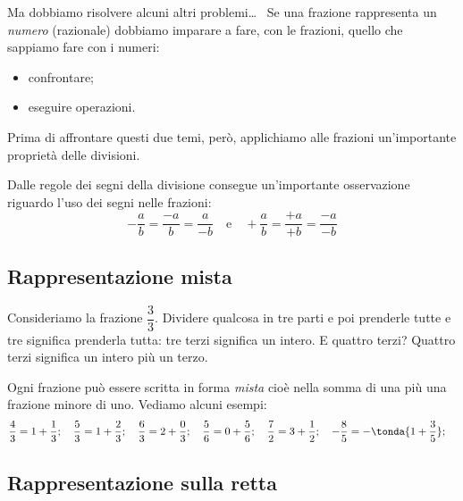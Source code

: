Ma dobbiamo risolvere alcuni altri problemi\dots~ 
Se una frazione rappresenta un \emph{numero} (razionale) dobbiamo imparare 
a fare, con le frazioni, quello che sappiamo fare con i numeri:


\begin{itemize} [nosep] %
 \item confrontare;
 \item eseguire operazioni.
\end{itemize}

Prima di affrontare questi due temi, però, applichiamo alle frazioni 
un'importante proprietà delle divisioni.

\begin{osservazione}{}{}
 Dalle regole dei segni della divisione consegue un'importante osservazione 
riguardo l'uso dei segni nelle frazioni:
\[-\dfrac{a}{b} = \dfrac{-a}{b} = \dfrac{a}{-b} \quad \text{e} \quad
  +\dfrac{a}{b} = \dfrac{+a}{+b} = \dfrac{-a}{-b}
\]
\end{osservazione}

\subsection{Rappresentazione mista}
\label{sub:razionali_rappresentazione_mista}

Consideriamo la frazione \(\dfrac{3}{3}\). Dividere qualcosa in tre parti e 
poi prenderle tutte e tre significa prenderla tutta: tre terzi significa 
un intero. E quattro terzi? Quattro terzi significa un intero più un terzo.

Ogni frazione può essere scritta in forma 
\emph{mista} cioè nella somma di 
una  più una frazione minore di uno. Vediamo alcuni esempi:
\[\frac{4}{3} = 1 + \frac{1}{3}; \quad
\frac{5}{3} = 1 + \frac{2}{3}; \quad
\frac{6}{3} = 2 + \frac{0}{3}; \quad
\frac{5}{6} = 0 + \frac{5}{6}; \quad
\frac{7}{2} = 3 + \frac{1}{2}; \quad
-\frac{8}{5} = -\tonda{1 + \frac{3}{5}}; \quad
\]

\subsection{Rappresentazione sulla retta}
\label{sub:razionali_rappresentazione_retta}

